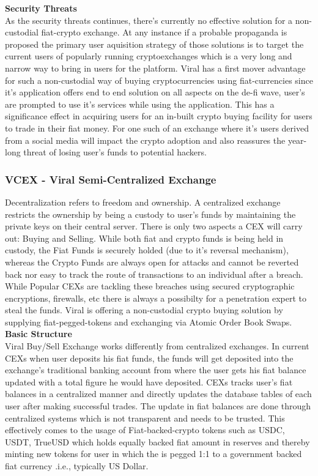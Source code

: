 \documentclass[10pt]{article}
\begin{document}
\textbf{Security Threats}\\

As the security threats continues, there's currently no effective solution for a non-custodial fiat-crypto exchange. At any instance if a probable propaganda is proposed the primary user aquisition strategy of those solutions is to target the current users of popularly running cryptoexchanges which is a very long and narrow way to bring in users for the platform. Viral has a first mover advantage for such a non-custodial way of buying cryptocurrencies using fiat-currencies since it's application offers end to end solution on all aspects on the de-fi wave, user's are prompted to use it's services while using the application. This has a significance effect in acquiring users for an in-built crypto buying facility for users to trade in their fiat money. For one such of an exchange where it's users derived from a social media will impact the crypto adoption and also reassures the year-long threat of losing user's funds to potential hackers.\\

\subsubsection{VCEX - Viral Semi-Centralized Exchange}

Decentralization refers to freedom and ownership. A centralized exchange restricts the ownership by being a custody to user's funds by maintaining the private keys on their central server. There is only two aspects a CEX will carry out: Buying and Selling. While both fiat and crypto funds is being held in custody, the Fiat Funds is securely holded (due to it's reversal mechanism), whereas the Crypto Funds are always open for attacks and cannot be reverted back nor easy to track the route of transactions to an individual after a breach. While Popular CEXs are tackling these breaches using secured cryptographic encryptions, firewalls, etc there is always a possibilty for a penetration expert to steal the funds. Viral is offering a non-custodial crypto buying solution by supplying fiat-pegged-tokens and exchanging via Atomic Order Book Swaps.\\

\textbf{Basic Structure}\\

Viral Buy/Sell Exchange works differently from centralized exchanges. In current CEXs when user deposits his fiat funds, the funds will get deposited into the exchange's traditional banking account from where the user gets his fiat balance updated with a total figure he would have deposited. CEXs tracks user's fiat balances in a centralized manner and directly updates the database tables of each user after making successful trades. The update in fiat balances are done through centralized systems which is not transparent and needs to be trusted. This effectively comes to the usage of Fiat-backed-crypto tokens such as USDC, USDT, TrueUSD which holds equally backed fiat amount in reserves and thereby minting new tokens for user in which the is pegged 1:1 to a government backed fiat currency .i.e., typically US Dollar.\\
\end{document}
